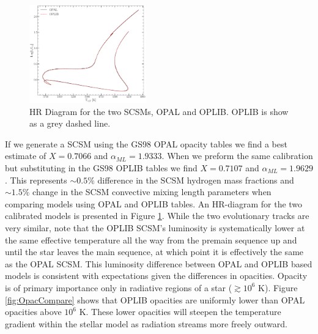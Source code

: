 \begin{figure}
	\centering
	\includegraphics[width=0.45\textwidth]{src/figures/HRDiagramOPALvsOPLIB_SCCM.pdf}
	\caption{HR Diagram for the two SCSMs, OPAL and OPLIB. OPLIB is show as a grey
	dashed line.}
	\label{fig:OPLIBOPALHR}
\end{figure}

If we generate a SCSM using the GS98 OPAL opacity tables we find a best
estimate of $X=0.7066$ and $\alpha_{ML} = 1.9333$. When we preform the same
calibration but substituting in the GS98 OPLIB tables we find $X=0.7107$ and
$\alpha_{ML} = 1.9629$. This represents $\sim 0.5\%$ difference in the SCSM
hydrogen mass fractions and $\sim 1.5\%$ change in the SCSM convective mixing
length parameters when comparing models using OPAL and OPLIB tables. An
HR-diagram for the two calibrated models is presented in Figure
\ref{fig:OPLIBOPALHR}. While the two evolutionary tracks are very similar, note
that the OPLIB SCSM's luminosity is systematically lower at the same effective
temperature all the way from the premain sequence up and until the star leaves
the main sequence, at which point it is effectively the same as the OPAL SCSM.
This luminosity difference between OPAL and OPLIB based models is consistent
with expectations given the differences in opacities. Opacity is of primary
importance only in radiative regions of a star ($\gtrsim 10^{6}$ K). Figure
\ref{fig:OpacCompare} shows that OPLIB opacities are uniformly lower than OPAL
opacities above $10^{6}$ K. These lower opacities will steepen the temperature
gradient within the stellar model as radiation streams more freely outward.
